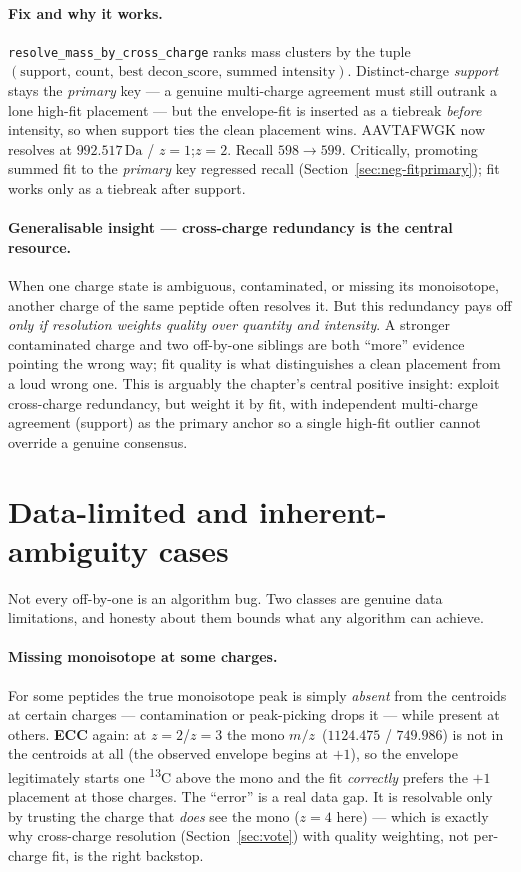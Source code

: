 \documentclass[11pt]{article}
\newcommand{\Da}{\,\text{Da}}
\newcommand{\Cthirteen}{\textsuperscript{13}C}
\newcommand{\mz}{\ensuremath{m/z}}
\newcommand{\zeq}[1]{\ensuremath{z{=}#1}}
\begin{document}
\paragraph{Fix and why it works.} \texttt{resolve\_mass\_by\_cross\_charge} ranks mass clusters by
the tuple $(\text{support},\, \text{count},\, \text{best decon\_score},\, \text{summed intensity})$.
Distinct-charge \emph{support} stays the \emph{primary} key --- a genuine multi-charge agreement must
still outrank a lone high-fit placement --- but the envelope-fit is inserted as a tiebreak
\emph{before} intensity, so when support ties the clean placement wins. AAVTAFWGK now resolves at
$992.517\Da$ / \zeq{1};\zeq{2}. Recall $598 \rightarrow 599$. Critically, promoting summed fit to the
\emph{primary} key regressed recall (Section~\ref{sec:neg-fitprimary}); fit works only as a tiebreak
after support.

\paragraph{Generalisable insight --- cross-charge redundancy is the central resource.} When one
charge state is ambiguous, contaminated, or missing its monoisotope, another charge of the same
peptide often resolves it. But this redundancy pays off \emph{only if resolution weights quality
over quantity and intensity}. A stronger contaminated charge and two off-by-one siblings are both
``more'' evidence pointing the wrong way; fit quality is what distinguishes a clean placement from a
loud wrong one. This is arguably the chapter's central positive insight: exploit cross-charge
redundancy, but weight it by fit, with independent multi-charge agreement (support) as the primary
anchor so a single high-fit outlier cannot override a genuine consensus.

\section{Data-limited and inherent-ambiguity cases}
\label{sec:datagaps}

Not every off-by-one is an algorithm bug. Two classes are genuine data limitations, and honesty
about them bounds what any algorithm can achieve.

\paragraph{Missing monoisotope at some charges.} For some peptides the true monoisotope peak is
simply \emph{absent} from the centroids at certain charges --- contamination or peak-picking drops
it --- while present at others. \textbf{ECC} again: at \zeq{2}/\zeq{3} the mono \mz\ ($1124.475$ /
$749.986$) is not in the centroids at all (the observed envelope begins at $+1$), so the envelope
legitimately starts one \Cthirteen{} above the mono and the fit \emph{correctly} prefers the $+1$
placement at those charges. The ``error'' is a real data gap. It is resolvable only by trusting the
charge that \emph{does} see the mono (\zeq{4} here) --- which is exactly why cross-charge resolution
(Section~\ref{sec:vote}) with quality weighting, not per-charge fit, is the right backstop.
\end{document}
